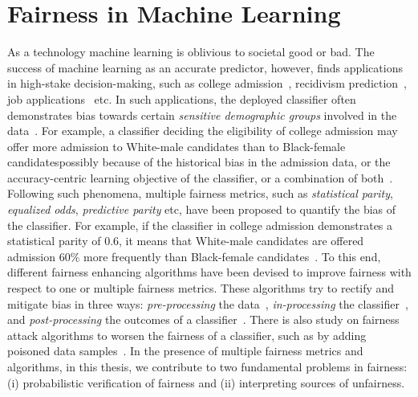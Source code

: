 \section{Fairness in Machine Learning}
As a technology machine learning is oblivious to societal good or bad. The success of machine learning as an accurate predictor, however, finds applications in high-stake decision-making, such as college admission~\cite{martinez2021using}, recidivism prediction~\cite{tollenaar2013method}, job applications~\cite{ajunwa2016hiring} etc. In such applications, the deployed  classifier often demonstrates bias towards certain \emph{sensitive demographic groups} involved in the data~\cite{dwork2012fairness}. For example, a classifier deciding the eligibility of college admission may offer more admission to White-male candidates than to Black-female candidates\textemdash possibly because of the historical bias in the admission data, or the accuracy-centric learning objective of the classifier, or a combination of both~\cite{berk2019accuracy,landy1978correlates,zliobaite2015relation}. Following such phenomena, multiple fairness metrics, such as \textit{statistical parity}, \textit{equalized odds}, \textit{predictive parity} etc, have been proposed to quantify the bias of the classifier. For example, if the classifier in college admission demonstrates a {statistical parity} of $ 0.6 $, it means that White-male candidates are offered admission $ 60\% $ more frequently than Black-female candidates~\cite{besse2021survey,feldman2015certifying,garg2020fairness}. To this end, different fairness enhancing algorithms have been devised to improve fairness with respect to one or multiple fairness metrics. These algorithms try to rectify and mitigate bias in three ways: \textit{pre-processing} the data~\cite{kamiran2012data,zemel2013learning,calmon2017optimized}, \textit{in-processing} the classifier~\cite{zhang2018mitigating}, and \textit{post-processing} the outcomes of a classifier~\cite{kamiran2012decision,hardt2016equality}. There is also study on fairness attack algorithms to worsen the fairness of a classifier, such as by adding poisoned data samples~\cite{solans2020poisoning}. In the presence of multiple fairness metrics and algorithms, in this thesis, we contribute to two fundamental problems in fairness: (i) probabilistic verification of fairness and (ii) interpreting sources of unfairness.


